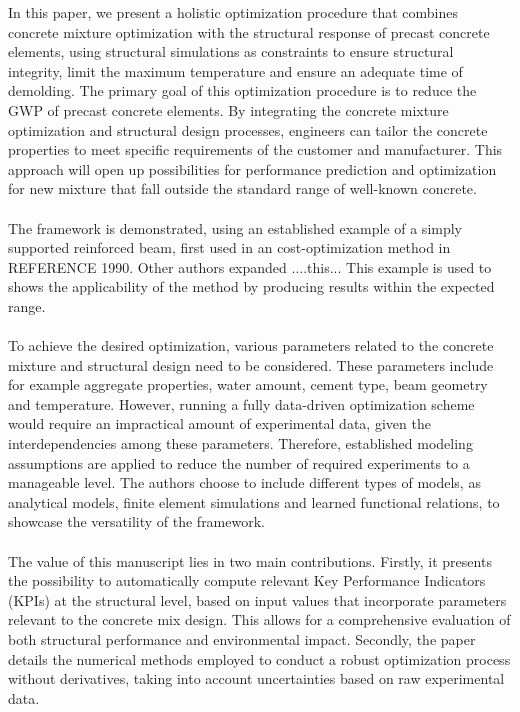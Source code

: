 %
In this paper, we present a holistic optimization procedure that combines concrete mixture optimization with the structural response of precast concrete elements, using structural simulations as constraints to ensure structural integrity, limit the maximum temperature and ensure an adequate time of demolding.
The primary goal of this optimization procedure is to reduce the GWP of precast concrete elements. 
By integrating the concrete mixture optimization and structural design processes, engineers can tailor the concrete properties to meet specific requirements of the customer and manufacturer.
This approach will open up possibilities for performance prediction and optimization for new mixture that fall outside the standard range of well-known concrete.\\\\
The framework is demonstrated, using an established example of a simply supported reinforced beam, first used in an cost-optimization method in REFERENCE 1990.
Other authors expanded ....this...
This example is used to shows the applicability of the method by producing results within the expected range.\\\\
%
To achieve the desired optimization, various parameters related to the concrete mixture and structural design need to be considered.
These parameters include for example aggregate properties, water amount, cement type, beam geometry and temperature. 
However, running a fully data-driven optimization scheme would require an impractical amount of experimental data, given the interdependencies among these parameters. 
Therefore, established modeling assumptions are applied to reduce the number of required experiments to a manageable level.
The authors choose to include different types of models, as analytical models, finite element simulations and learned functional relations, to showcase the versatility of the framework.
\\\\
%
The value of this manuscript lies in two main contributions. 
Firstly, it presents the possibility to automatically compute relevant Key Performance Indicators (KPIs) at the structural level, based on input values that incorporate parameters relevant to the concrete mix design. 
This allows for a comprehensive evaluation of both structural performance and environmental impact. 
Secondly, the paper details the numerical methods employed to conduct a robust optimization process without derivatives, taking into account uncertainties based on raw experimental data.\\\\
